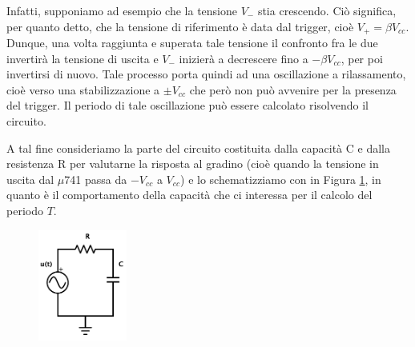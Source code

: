 Infatti, supponiamo ad esempio che la tensione $V_-$ stia crescendo. Ciò significa, per quanto detto, che la tensione di riferimento è data dal trigger, cioè $V_+=\beta V_{cc}$. Dunque, una volta raggiunta e superata tale tensione il confronto fra le due invertirà la tensione di uscita e $V_-$ inizierà a decrescere fino a $-\beta V_{cc}$, per poi invertirsi di nuovo. Tale processo porta quindi ad una oscillazione a rilassamento, cioè verso una stabilizzazione a $\pm V_{cc}$ che però non può avvenire per la presenza del trigger. Il periodo di tale oscillazione può essere calcolato risolvendo il circuito.

A tal fine consideriamo la parte del circuito costituita dalla capacità C e dalla resistenza R per valutarne la risposta al gradino (cioè quando la tensione in uscita dal $\mu$741 passa da $-V_{cc}$ a $V_{cc}$) e lo schematizziamo con in Figura \ref{cir4:oscillatore_spi}, in quanto è il comportamento della capacità che ci interessa per il calcolo del periodo $T$.

\begin{figure}
  \begin{center}
    \includegraphics[width=0.26\textwidth]{../E04/latex/c_rilassamento_spi.pdf}
  \end{center}
  \caption{}
  \label{cir4:oscillatore_spi}
\end{figure}

